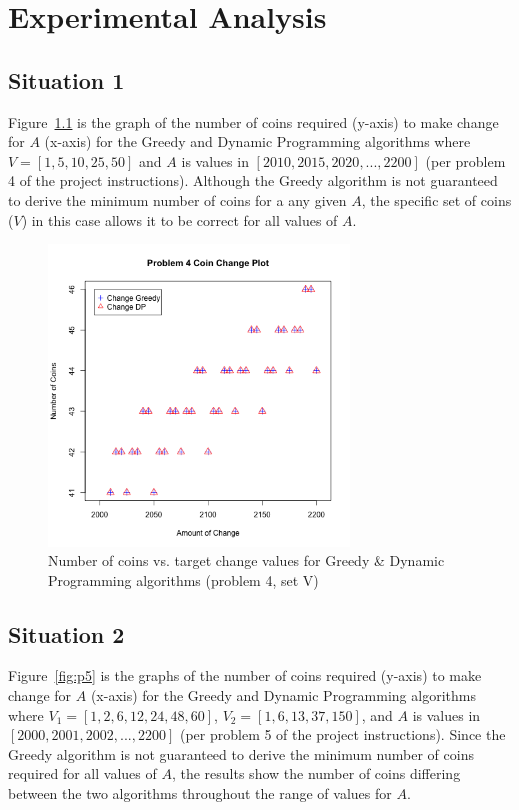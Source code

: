 \documentclass[11pt]{scrreprt}
\begin{document}
\chapter{Experimental Analysis}

\section{Situation 1}
\label{sec:sit1}

Figure~\ref{fig:p4} is the graph of the number of coins required (y-axis) to make change for $A$ (x-axis) for the Greedy and Dynamic Programming algorithms where $V = [1, 5, 10, 25, 50]$ and $A$ is values in $[2010, 2015, 2020, ..., 2200]$  (per problem 4 of the project instructions). Although the Greedy algorithm is not guaranteed to derive the minimum number of coins for a any given $A$, the specific set of coins ($V$) in this case allows it to be correct for all values of $A$.

\begin{figure}[!htbp]
\centering
\includegraphics[width=8cm]{situation1.png}
\caption{Number of coins vs. target change values for Greedy \& Dynamic Programming algorithms (problem 4, set V)}
\label{fig:p4}
\end{figure}

\section{Situation 2}
\label{sec:sit2}

Figure~\ref{fig:p5} is the graphs of the number of coins required (y-axis) to make change for $A$ (x-axis) for the Greedy and Dynamic Programming algorithms where $V_1 = [1, 2, 6, 12, 24, 48, 60]$, $V_2 = [1, 6, 13, 37, 150]$, and $A$ is values in $[2000, 2001, 2002, ..., 2200]$ (per problem 5 of the project instructions). Since the Greedy algorithm is not guaranteed to derive the minimum number of coins required for all values of $A$, the results show the number of coins differing between the two algorithms throughout the range of values for $A$.
\end{document}
